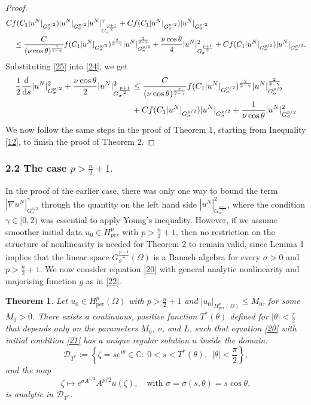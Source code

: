 \documentclass[12pt]{article}
\theoremstyle{plain}
\newtheorem{theorem}{Theorem}
\theoremstyle{remark}
\newcommand{\dd}{\mathrm{d}}
\newcommand{\Gspace}{G_\sigma^{p/2}}
\begin{document}
\begin{proof}
\begin{align}
 & Cf(C_1 |u^N|_{\Gspace})|u^N|_{\Gspace}|u^N|^\gamma_{G_\sigma^{\frac{p+1}{2}}}+ C f(C_1 |u^N|_{\Gspace})|u^N|_{\Gspace}\notag\\ &\quad \leq \frac{C}{(\nu \cos\theta)^{\frac{\gamma}{2-\gamma}}} f(C_1 |u^N|_{\Gspace})^{\frac{2}{2-\gamma}}|u^N|_{\Gspace}^{\frac{2}{2-\gamma}}+\frac{\nu \cos\theta}{4} |u^N|^2_{G_\sigma^{\frac{p+1}{2}}}+C 
f(C_1 |u^N|_{\Gspace})|u^N|_{\Gspace}.\label{25}
\end{align}
Substituting \eqref{25} into \eqref{24}, we get
\begin{align*}
\frac{1}{2} \frac{\dd}{\dd s} |u^N|_{G_\sigma^{p/2}}^2 + \frac{\nu \cos\theta}{2}|u^N|_{G_\sigma^{\frac{p+1}{2}}}^2 \notag 
 &\leq \frac{C}{(\nu \cos\theta)^{\frac{\gamma}{2-\gamma}}} f(C_1 |u^N|_{\Gspace})^{\frac{2}{2-\gamma}}|u^N|_{\Gspace}^{\frac{2}{2-\gamma}} \\&+C 
f(C_1 |u^N|_{\Gspace})|u^N|_{\Gspace}+\frac{1}{\nu \cos\theta}|u^N|_{
G_\sigma^{p/2}
}^2
\end{align*}
We now follow the same steps in the proof of Theorem 1, starting from Inequality \eqref{12}, to finish the proof of Theorem 2. 
\end{proof}
\subsubsection*{2.2 The case $ p > \frac{n}{2}+1.$}
In the proof of the earlier case, there was only one way to bound the term $|\nabla u^N|^{\gamma}_{\Gspace}$ through the quantity on the left hand side $|u^N|^2_{G_\sigma^{\frac{p+1}{2}}}$, where the condition $\gamma \in [0,2)$ was essential to apply Young's inequality. However, if we assume smoother initial data $u_0\in H^p_{per}$ with $ p > \frac{n}{2}+1$, then no restriction on the structure of nonlinearity is needed for Theorem 2 to remain valid, since  Lemma 1 implies that the linear space $G_{\sigma}^{\frac{p-1}{2}}(\Omega)$ is a Banach algebra for every 
$\sigma > 0$ and \( p > \frac{n}{2}+1 \). We now consider equation \eqref{20} with general analytic nonlinearity and majorising function $g$ as in \eqref{22}.
\begin{theorem}
Let $u_0 \in {H}^p_{\text{per}}(\Omega)$ with \( p > \frac{n}{2}+1 \) and $|u_0|_{{H}^p_{\text{per}}(\Omega)} \le M_0$, for some $M_0 > 0$. There exists a continuous, positive function $T^*(\theta)$ defined for $|\theta| < \frac{\pi}{2}$ that depends only on the parameters $M_0$, $\nu$, and $L$, such that equation \eqref{20} with initial condition \eqref{21} has a unique regular solution $u$ inside the domain:
\[
\mathcal{D}_{T^*} := \left\{\zeta = s e^{i\theta} \in \mathbb{C} :\ 0 < s < T^*(\theta), \ \ |\theta| < \frac{\pi}{2}\right\},
\]
and the map
\[
\zeta \longmapsto e^{\sigma A^{1/2}} A^{p/2} u(\zeta), \quad \text{with } \sigma = \sigma(s,\theta) = s\cos\theta,
\]
is analytic in $\mathcal{D}_{T^*}$.
\end{theorem}
\end{document}
